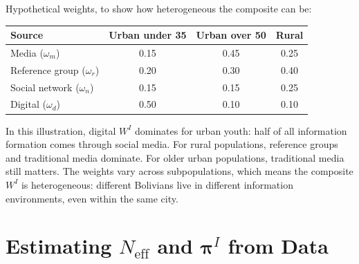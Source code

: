 \documentclass[../structural_economics_book.tex]{subfiles}
\begin{document}
\begin{example}\label{ch21:ex:composite}
Hypothetical weights, to show how heterogeneous the composite can be:
\begin{center}
\begin{tabular}{lccc}
\toprule
Source & Urban under 35 & Urban over 50 & Rural \\
\midrule
Media ($\omega_m$) & 0.15 & 0.45 & 0.25 \\
Reference group ($\omega_r$) & 0.20 & 0.30 & 0.40 \\
Social network ($\omega_n$) & 0.15 & 0.15 & 0.25 \\
Digital ($\omega_d$) & 0.50 & 0.10 & 0.10 \\
\bottomrule
\end{tabular}
\end{center}

In this illustration, digital $W^I$ dominates for urban youth: half of all information formation comes through social media. For rural populations, reference groups and traditional media dominate. For older urban populations, traditional media still matters. The weights vary across subpopulations, which means the composite $W^I$ is heterogeneous: different Bolivians live in different information environments, even within the same city.
\end{example}


\section{Estimating $N_{\text{eff}}$ and $\boldsymbol{\pi}^I$ from Data}
\label{ch21:sec:estimation}
\end{document}
